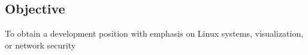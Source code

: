 \documentclass[margin,line]{resume}
\begin{document}
\address{813 Troy Rd\\Edwardsville\\IL 62025 $\bullet$ (618) 530-0659 $\bullet$ jcook@siue.edu}
\begin{resume}
\section{Objective}
To obtain a development position with emphasis on Linux systems, visualization, or network security



\end{resume}
\end{document}
